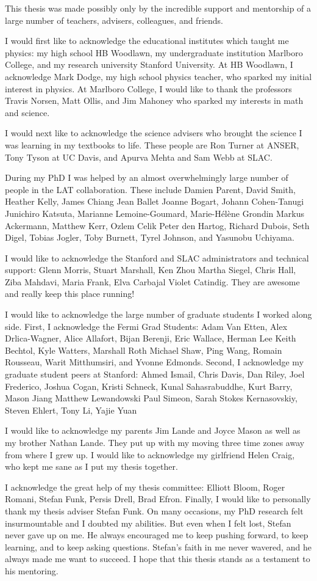 
This thesis was made possibly only by the incredible support and
mentorship of a large number of teachers, advisers, colleagues, and
friends.

I would first like to acknowledge the educational institutes which taught
me physics: my high school HB Woodlawn, my undergraduate institution
Marlboro College, and my research university Stanford University.  At HB
Woodlawn, I acknowledge Mark Dodge, my high school physics teacher, who
sparked my initial interest in physics. At Marlboro College, I would like
to thank the professors Travis Norsen, Matt Ollis, and Jim Mahoney who
sparked my interests in math and science.

I would next like to acknowledge the science advisers who brought the
science I was learning in my textbooks to life.  These people are Ron
Turner at ANSER, Tony Tyson at UC Davis, and Apurva Mehta and Sam Webb
at SLAC.

During my PhD I was helped by an almost overwhelmingly large number
of people in the \gls{LAT} collaboration.  These include Damien Parent,
David Smith, Heather Kelly, James Chiang Jean Ballet Joanne Bogart, Johann
Cohen-Tanugi Junichiro Katsuta, Marianne Lemoine-Goumard, Marie-H\'el\`ene
Grondin Markus Ackermann, Matthew Kerr, Ozlem Celik Peter den Hartog,
Richard Dubois, Seth Digel, Tobias Jogler, Toby Burnett, Tyrel Johnson,
and Yasunobu Uchiyama.

I would like to acknowledge the Stanford and SLAC administrators and
technical support: Glenn Morris, Stuart Marshall, Ken Zhou Martha Siegel,
Chris Hall, Ziba Mahdavi, Maria Frank, Elva Carbajal Violet Catindig.
They are awesome and really keep this place running!

I would like to acknowledge the large number of graduate students I
worked along side.  First, I acknowledge the Fermi Grad Students: Adam Van
Etten, Alex Drlica-Wagner, Alice Allafort, Bijan Berenji, Eric Wallace,
Herman Lee Keith Bechtol, Kyle Watters, Marshall Roth Michael Shaw, Ping
Wang, Romain Rousseau, Warit Mitthumsiri, and Yvonne Edmonds.  Second,
I acknowledge my graduate student peers at Stanford: Ahmed Ismail, Chris
Davis, Dan Riley, Joel Frederico, Joshua Cogan, Kristi Schneck, Kunal
Sahasrabuddhe, Kurt Barry, Mason Jiang Matthew Lewandowski Paul Simeon,
Sarah Stokes Kernasovskiy, Steven Ehlert, Tony Li, Yajie Yuan

I would like to acknowledge my parents Jim Lande and Joyce Mason as well
as my brother Nathan Lande. They put up with my moving three time zones
away from where I grew up. I would like to acknowledge my girlfriend
Helen Craig, who kept me sane as I put my thesis together.

I acknowledge the great help of my thesis committee: Elliott Bloom, Roger
Romani, Stefan Funk, Persis Drell, Brad Efron. Finally, I would like to
personally thank my thesis adviser Stefan Funk.  On many occasions, my
PhD research felt insurmountable and I doubted my abilities.  But even
when I felt lost, Stefan never gave up on me. He always encouraged me to
keep pushing forward, to keep learning, and to keep asking questions.
Stefan's faith in me never wavered, and he always made me want to
succeed. I hope that this thesis stands as a testament to his mentoring.
